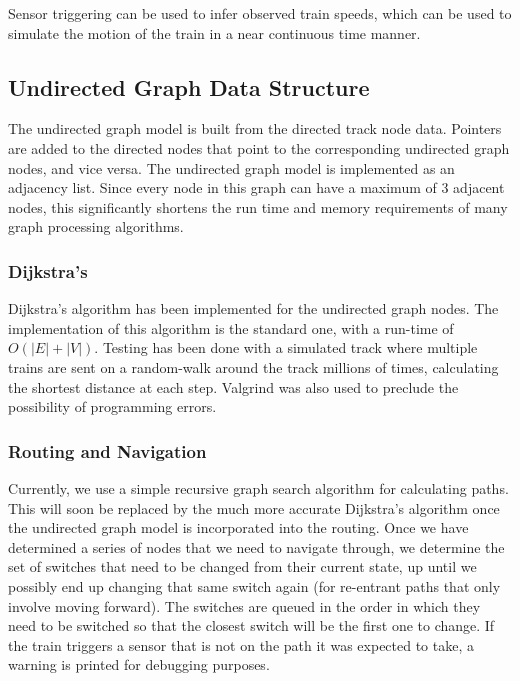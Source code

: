 \documentclass[letterpaper]{article}
\begin{document}
Sensor triggering can be used to infer observed train speeds, which can be used to simulate the motion of the train in a near continuous time manner.


\subsection{Undirected Graph Data Structure%
  \label{undirected-graph-data-structure}%
}

The undirected graph model is built from the directed track node data.  Pointers are added to the directed nodes that point to the corresponding undirected graph nodes, and vice versa.  The undirected graph model is implemented as an adjacency list.  Since every node in this graph can have a maximum of 3 adjacent nodes, this significantly shortens the run time and memory requirements of many graph processing algorithms.


\subsubsection{Dijkstra's%
  \label{dijkstra-s}%
}

Dijkstra's algorithm has been implemented for the undirected graph nodes.  The implementation of this algorithm is the standard one, with a run-time of $O(|E| + |V|)$.  Testing has been done with a simulated track where multiple trains are sent on a random-walk around the track millions of times, calculating the shortest distance at each step.  Valgrind was also used to preclude the possibility of programming errors.


\subsubsection{Routing and Navigation%
  \label{routing-and-navigation}%
}

Currently, we use a simple recursive graph search algorithm for calculating paths.  This will soon be replaced by the much more accurate Dijkstra's algorithm once the undirected graph model is incorporated into the routing.  Once we have determined a series of nodes that we need to navigate through, we determine the set of switches that need to be changed from their current state, up until we possibly end up changing that same switch again (for re-entrant paths that only involve moving forward).  The switches are queued in the order in which they need to be switched so that the closest switch will be the first one to change.  If the train triggers a sensor that is not on the path it was expected to take, a warning is printed for debugging purposes.
\end{document}
